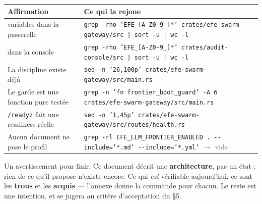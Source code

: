 \documentclass[10pt]{article}
\newcommand{\sz}[1]{\textcolor{grey}{\small\textsf{#1}}}
\newcommand{\code}[1]{\texttt{\small #1}}
\newcommand{\fl}{$\rightarrow$}
\begin{document}
\renewcommand{\arraystretch}{1.22}
\begin{center}\small
\begin{tabular}{@{}>{\raggedright\arraybackslash}p{5.2cm} >{\raggedright\arraybackslash}p{10.8cm}@{}}
\toprule
\textbf{Affirmation} & \textbf{Ce qui la rejoue} \\
\midrule
25 variables dans la passerelle &
  \code{grep -rho 'EFE\_[A-Z0-9\_]*' crates/efe-swarm-gateway/src | sort -u | wc -l} \\
7 dans la console &
  \code{grep -rho 'EFE\_[A-Z0-9\_]*' crates/audit-console/src | sort -u | wc -l} \\
La discipline existe déjà &
  \code{sed -n '26,100p' crates/efe-swarm-gateway/src/main.rs} \\
Le garde est une fonction pure testée &
  \code{grep -n 'fn frontier\_boot\_guard' -A 6 crates/efe-swarm-gateway/src/main.rs} \\
\code{/readyz} fait une readiness réelle &
  \code{sed -n '1,45p' crates/efe-swarm-gateway/src/routes/health.rs} \\
Aucun document ne pose le profil &
  \code{grep -rl EFE\_LLM\_FRONTIER\_ENABLED . -{}-include='*.md' -{}-include='*.yml'} \sz{\fl{} vide} \\
\bottomrule
\end{tabular}
\end{center}

Un avertissement pour finir. Ce document décrit une \textbf{architecture}, pas un état : rien de ce
qu'il propose n'existe encore. Ce qui \emph{est} vérifiable aujourd'hui, ce sont les \textbf{trous} et
les \textbf{acquis} --- l'annexe donne la commande pour chacun. Le reste est une intention, et se
jugera au critère d'acceptation du §5.
\end{document}
